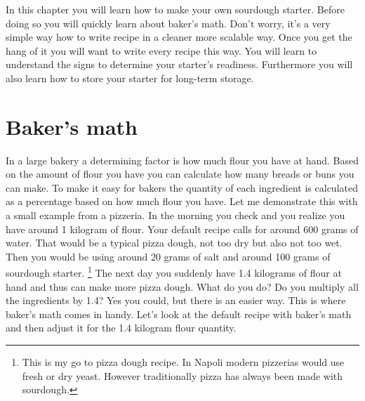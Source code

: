 In this chapter you will learn how to make your
own sourdough starter. Before doing so you will
quickly learn about baker's math. Don't worry,
it's a very simple way how to write recipe in
a cleaner more scalable way. Once you get the hang
of it you will want to write every recipe this way.
You will learn to understand the signs to determine
your starter's readiness.  Furthermore you will
also learn how to store your starter for
long-term storage.

\section{Baker's math}

In a large bakery a determining factor is how
much flour you have at hand. Based on the amount
of flour you have you can calculate how many
breads or buns you can make. To make it easy
for bakers the quantity of each ingredient
is calculated as a percentage based on how much flour you have.
Let me demonstrate this with a small example from
a pizzeria.  In the morning you check and you realize you
have around 1 kilogram of flour.
Your default recipe calls for around 600 grams of water.
That would be a typical pizza dough, not too dry but
also not too wet. Then you would be using around 20 grams
of salt and around 100 grams of sourdough starter.
\footnote{This is my go to pizza dough recipe. In Napoli
modern pizzerias would use fresh or dry yeast. However
traditionally pizza has always been made with sourdough.}
The next day you suddenly have 1.4 kilograms of flour
at hand and thus can make more pizza dough. What do you do?
Do you multiply all the ingredients by 1.4? Yes you could,
but there is an easier way. This is where baker's math
comes in handy. Let's look at the default recipe with baker's
math and then adjust it for the 1.4 kilogram flour quantity.

\begin{table}[H]
\centering
{}
\end{table}

